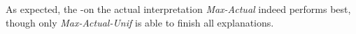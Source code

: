 As expected, the \maxsat-\grow on the actual interpretation \emph{Max-Actual} indeed performs best, though only \emph{Max-Actual-Unif} is able to finish all explanations. 


